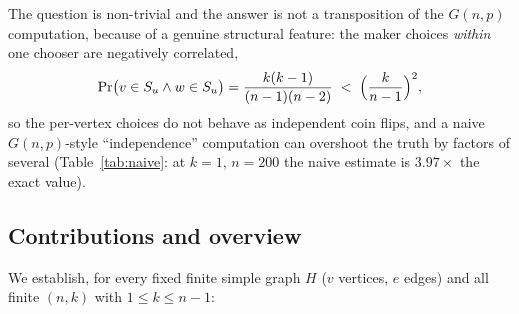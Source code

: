 \documentclass[11pt,a4paper]{article}
\theoremstyle{definition}
\theoremstyle{definition}
\begin{document}
The question is non-trivial and the answer is not a transposition of the
$G(n,p)$ computation, because of a genuine structural feature: the maker choices
\emph{within} one chooser are negatively correlated,
\begin{equation}\label{eq:negcorr}
\Pr\bigl(v\in S_u \wedge w\in S_u\bigr)=\frac{k(k-1)}{(n-1)(n-2)}
\;<\;\Bigl(\frac{k}{n-1}\Bigr)^{2},
\end{equation}
so the per-vertex choices do not behave as independent coin flips, and a naive
$G(n,p)$-style ``independence'' computation can overshoot the truth by factors
of several (Table~\ref{tab:naive}: at $k=1$, $n=200$ the naive estimate is
$3.97\times$ the exact value).

\subsection{Contributions and overview}
We establish, for every fixed finite simple graph $H$ ($v$ vertices, $e$ edges) and
all finite $(n,k)$ with $1\le k\le n-1$:
\end{document}
